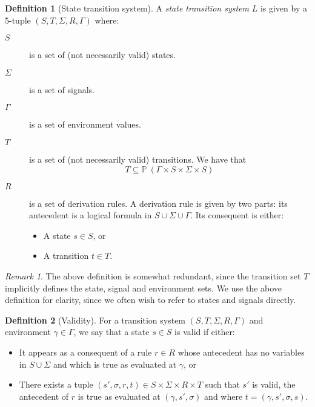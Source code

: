 \documentclass[11pt,a4paper]{article}
\newcommand{\powerset}[1]{\mathbb{P}~#1}
\theoremstyle{definition}
\newtheorem{definition}{Definition}[section]
\theoremstyle{remark}
\newtheorem{remark}{Remark}[section]
\begin{document}
\begin{definition}[State transition system]
A \textit{state transition system} $L$ is given by a 5-tuple $(S, T, \Sigma, R, \Gamma)$
where:
\begin{description}
\item[$S$] is a set of (not necessarily valid) states.
\item[$\Sigma$] is a set of signals.
\item[$\Gamma$] is a set of environment values.
\item[$T$] is a set of (not necessarily valid) transitions. We have
  that \[T\subseteq\powerset{(\Gamma\times S\times\Sigma\times S)}\]
\item[$R$] is a set of derivation rules. A derivation rule is given by two
  parts: its antecedent is a logical formula in $S\cup\Sigma\cup\Gamma$. Its
  consequent is either:
  \begin{itemize}
  \item A state $s\in S$, or
  \item A transition $t\in T$.
  \end{itemize}
\end{description}
\end{definition}
\begin{remark}
  The above definition is somewhat redundant, since the transition set $T$
  implicitly defines the state, signal and environment sets. We use the above
  definition for clarity, since we often wish to refer to states and signals directly.
\end{remark}
\begin{definition}[Validity]
  For a transition system $(S, T, \Sigma, R, \Gamma)$ and environment $\gamma\in\Gamma$, we say that a state $s\in
  S$ is valid if either:
\begin{itemize}
\item It appears as a consequent of a rule $r\in R$ whose antecedent has no
  variables in $S\cup\Sigma$ and which is true as evaluated at $\gamma$, or
\item There exists a tuple $(s', \sigma, r, t)\in S\times\Sigma\times R \times
  T$ such that $s'$ is valid, the antecedent of $r$ is true as evaluated at $(\gamma, s',
  \sigma)$ and where $t=(\gamma, s', \sigma, s)$.
\end{itemize}
\end{definition}
\end{document}
